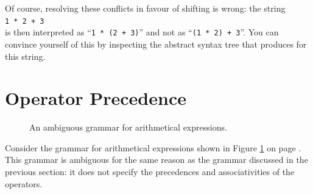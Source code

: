 Of course, resolving these conflicts in favour of shifting is wrong: the string
\\[0.2cm]
\hspace*{1.3cm}
\texttt{1 * 2 + 3}
\\[0.2cm]
is then interpreted as ``\texttt{1 * (2 + 3)}'' and not as ``\texttt{(1 * 2) + 3}''.  You can convince yourself
of this by inspecting the abstract syntax tree that  produces for this string.

\section{Operator Precedence \label{section:operator-precedence}}

\begin{figure}[!ht]
  \begin{center}    
  \end{center}
  \caption{An ambiguous grammar for arithmetical expressions.}
  \label{fig:grammar-resolved.g}
\end{figure}

\noindent
Consider the grammar for arithmetical expressions shown in Figure \ref{fig:grammar-resolved.g} on page
\pageref{fig:grammar-resolved.g}.  This grammar is ambiguous for the same reason as the grammar discussed in
the previous section: it does not specify the precedences and associativities of the operators.


